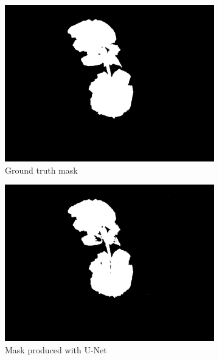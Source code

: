 \documentclass[letterpaper]{article}
\begin{document}
{\begin{figure}[H]
	\centering
	\begin{subfigure}[h]{.30\textwidth}
	  \centering
	  \includegraphics[width=1\linewidth]{figures/IMG_1115-mask.jpg}
	  \caption{Ground truth mask}
	  \label{fig:original}
	\end{subfigure}
	\begin{subfigure}[h]{.30\textwidth}
	  \centering
	  \includegraphics[width=1\linewidth]{figures/IMG_1115-mask-unet.png}
	  \caption{Mask produced with U-Net}
	  \label{fig:mask}
	\end{subfigure}
	\begin{subfigure}[h]{.30\textwidth}
	  \centering

\end{subfigure}
\end{figure}}
\end{document}
